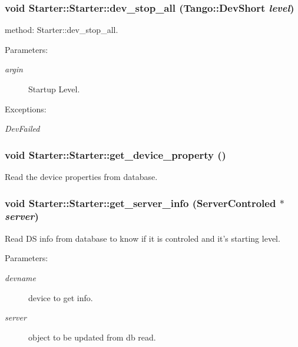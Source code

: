 \subsubsection{\setlength{\rightskip}{0pt plus 5cm}void Starter::Starter::dev\_\-stop\_\-all (Tango::Dev\-Short {\em level})}\label{classStarter_1_1Starter_z5_2}


method: Starter::dev\_\-stop\_\-all.

\begin{Desc}
\item[Parameters: ]\par
\begin{description}
\item[{\em 
argin}]Startup Level. \end{description}
\end{Desc}
\begin{Desc}
\item[Exceptions: ]\par
\begin{description}
\item[{\em 
Dev\-Failed}] \end{description}
\end{Desc}
\subsubsection{\setlength{\rightskip}{0pt plus 5cm}void Starter::Starter::get\_\-device\_\-property ()}\label{classStarter_1_1Starter_z5_10}


Read the device properties from database.

\subsubsection{\setlength{\rightskip}{0pt plus 5cm}void Starter::Starter::get\_\-server\_\-info ({\bf Server\-Controled} $\ast$ {\em server})\hspace{0.3cm}{\tt  [protected]}}\label{classStarter_1_1Starter_z6_1}


Read DS info from database to know if it is controled and it's starting level.

\begin{Desc}
\item[Parameters: ]\par
\begin{description}
\item[{\em 
devname}]device to get info. \item[{\em 
server}]object to be updated from db read. \end{description}
\end{Desc}
